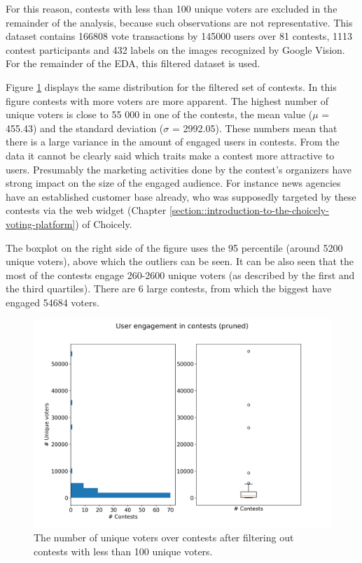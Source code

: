     For this reason, contests with less than 100 unique voters are excluded in the remainder of the analysis, because such observations are not representative. This dataset contains 166808 vote transactions by 145000 users over 81 contests, 1113 contest participants and 432 labels on the images recognized by Google Vision. For the remainder of the EDA, this filtered dataset is used.

    Figure \ref{user_engagement_in_contests-pruned} displays the same distribution for the filtered set of contests. In this figure contests with more voters are more apparent. The highest number of unique voters is close to 55 000 in one of the contests, the mean value ($\mu$ = 455.43) and the standard deviation ($\sigma$ = 2992.05). These numbers mean that there is a large variance in the amount of engaged users in contests. From the data it cannot be clearly said which traits make a contest more attractive to users. Presumably the marketing activities done by the contest's organizers have strong impact on the size of the engaged audience. For instance news agencies have an established customer base already, who was supposedly targeted by these contests via the web widget (Chapter \ref{section::introduction-to-the-choicely-voting-platform}) of Choicely. 
    
    The boxplot on the right side of the figure uses the 95 percentile (around 5200 unique voters), above which the outliers can be seen. It can be also seen that the most of the contests engage 260-2600 unique voters (as described by the first and the third quartiles). There are 6 large contests, from which the biggest have engaged 54684 voters. 

    \begin{figure}[h] 
        \begin{center}
            \includegraphics[width=1\textwidth]{Images/user_engagement_in_contests-pruned.png}
            \caption{The number of unique voters over contests after filtering out contests with less than 100 unique voters.}
            \label{user_engagement_in_contests-pruned}
        \end{center}
    \end{figure}
    
